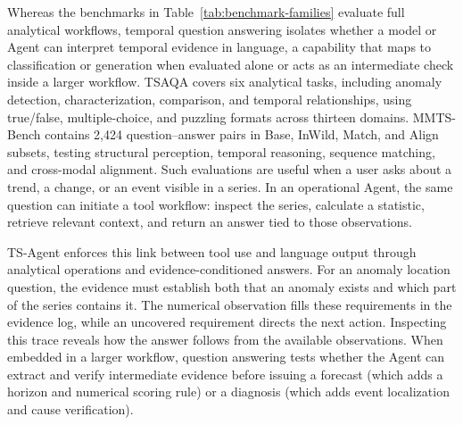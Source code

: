 \documentclass[preprints,article,submit,moreauthors]{Definitions/mdpi}
\begin{document}
Whereas the benchmarks in Table~\ref{tab:benchmark-families} evaluate full analytical workflows, temporal question answering isolates whether a model or Agent can interpret temporal evidence in language, a capability that maps to classification or generation when evaluated alone or acts as an intermediate check inside a larger workflow. TSAQA \citep{tsaqa2026} covers six analytical tasks, including anomaly detection, characterization, comparison, and temporal relationships, using true/false, multiple-choice, and puzzling formats across thirteen domains. MMTS-Bench \citep{mmtsbench2026} contains 2,424 question--answer pairs in Base, InWild, Match, and Align subsets, testing structural perception, temporal reasoning, sequence matching, and cross-modal alignment. Such evaluations are useful when a user asks about a trend, a change, or an event visible in a series. In an operational Agent, the same question can initiate a tool workflow: inspect the series, calculate a statistic, retrieve relevant context, and return an answer tied to those observations.


TS-Agent \citep{tsagent2025} enforces this link between tool use and language output through analytical operations and evidence-conditioned answers. For an anomaly location question, the evidence must establish both that an anomaly exists and which part of the series contains it. The numerical observation fills these requirements in the evidence log, while an uncovered requirement directs the next action. Inspecting this trace reveals how the answer follows from the available observations. When embedded in a larger workflow, question answering tests whether the Agent can extract and verify intermediate evidence before issuing a forecast (which adds a horizon and numerical scoring rule) or a diagnosis (which adds event localization and cause verification).
\end{document}
